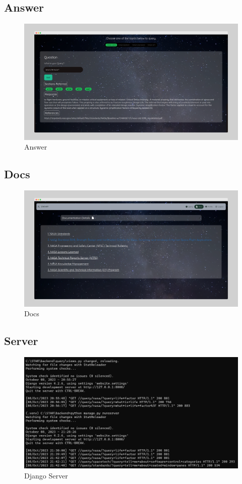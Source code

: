 \documentclass[11pt]{article}
\begin{document}
\subsection{Answer}
\begin{figure}[H]
	\centering
	\includegraphics[width=.95\textwidth]{./answer.png}
	\caption{Answer}
\end{figure}
\subsection{Docs}
\begin{figure}[H]
	\centering
	\includegraphics[width=.95\textwidth]{./doc.png}
	\caption{Docs}
\end{figure}

\subsection{Server}
\begin{figure}[H]
	\centering
	\includegraphics[width=.95\textwidth]{./server.jpeg}
	\caption{Django Server}
\end{figure}
\end{document}
